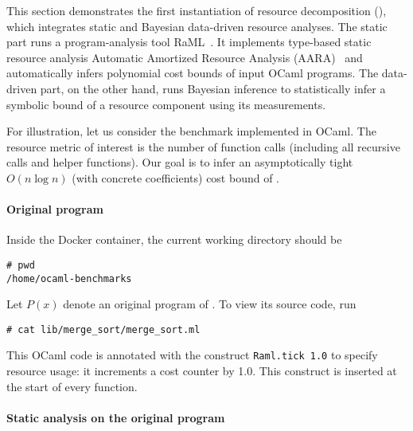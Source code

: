 This section demonstrates the first instantiation of resource decomposition
(), which integrates static and Bayesian
data-driven resource analyses.
%
The static part runs a program-analysis tool RaML~\citep{RaML,Hoffmann2017}.
%
It implements type-based static resource analysis Automatic Amortized Resource
Analysis (AARA)~\citep{Hofmann2003,Hoffmann2011a,Hoffmann2022} and automatically
infers polynomial cost bounds of input OCaml programs.
%
The data-driven part, on the other hand, runs Bayesian inference to
statistically infer a symbolic bound of a resource component using its
measurements.

For illustration, let us consider the benchmark \mergesort{} implemented in
OCaml.
%
The resource metric of interest is the number of function calls (including all
recursive calls and helper functions).
%
Our goal is to infer an asymptotically tight $O (n \log n)$ (with concrete
coefficients) cost bound of \mergesort{}.

\paragraph{Original program}

Inside the Docker container, the current working directory should be
\begin{verbatim}
# pwd
/home/ocaml-benchmarks
\end{verbatim}
%
Let $P(x)$ denote an original program of \mergesort{}.
%
To view its source code, run
\begin{verbatim}
# cat lib/merge_sort/merge_sort.ml
\end{verbatim}
%
This OCaml code is annotated with the construct \texttt{Raml.tick 1.0} to
specify resource usage: it increments a cost counter by 1.0.
%
This construct is inserted at the start of every function.

\paragraph{Static analysis on the original program}

